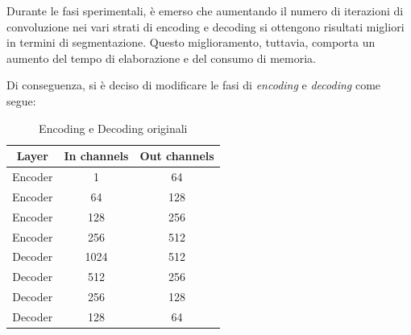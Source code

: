 Durante le fasi sperimentali, è emerso che aumentando il numero di iterazioni di convoluzione nei
vari strati di encoding e decoding si ottengono risultati migliori in termini di segmentazione.
Questo miglioramento, tuttavia, comporta un aumento del tempo di elaborazione e del consumo di
memoria.

Di conseguenza, si è deciso di modificare le fasi di \textit{encoding} e \textit{decoding} come segue:

\begin{table}[!ht]
    \centering
    \begin{tabular}{|c|c|c|}
        \hline
        \textbf{Layer} & \textbf{In channels} & \textbf{Out channels} \\
        \hline
        \hline
        Encoder        & 1                    & 64                    \\
        \hline
        Encoder        & 64                   & 128                   \\
        \hline
        Encoder        & 128                  & 256                   \\
        \hline
        Encoder        & 256                  & 512                   \\
        \hline
        Decoder        & 1024                 & 512                   \\
        \hline
        Decoder        & 512                  & 256                   \\
        \hline
        Decoder        & 256                  & 128                   \\
        \hline
        Decoder        & 128                  & 64                    \\
        \hline
    \end{tabular}
    \caption{Encoding e Decoding originali}
    \label{tab:encoding_originale}
\end{table}

